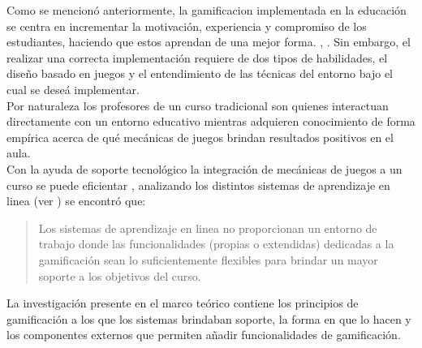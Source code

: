  Como se mencionó anteriormente, la \gls{gamificacion} implementada en la educación se centra
 en incrementar la motivación, experiencia y compromiso de los estudiantes, haciendo que estos
 aprendan de una mejor forma. \cite{GamInE-Learning}, \cite{Lee}.
 \noindent Sin embargo, el realizar una correcta implementación requiere de dos tipos de habilidades, el
 diseño basado en juegos y el entendimiento de las técnicas del entorno bajo el cual se deseá
 implementar. \cite[p. 7]{FrameWorkForTheWin}\\

 \noindent Por naturaleza los profesores de un curso tradicional son quienes interactuan
 directamente con un entorno educativo mientras adquieren conocimiento de forma empírica
 acerca de qué mecánicas de juegos brindan resultados positivos en el aula.\\

 \noindent Con la ayuda de soporte tecnológico la integración de mecánicas de juegos a un
 curso se puede eficientar \cite{Wood-Reiners}, analizando los distintos sistemas de aprendizaje en linea
 (ver ) se encontró que:

    \begin{quote}
    \colorbox{blue!05}{\parbox{\dimexpr\linewidth-2\fboxsep}{\strut%
        Los sistemas de aprendizaje en linea no proporcionan un entorno
        de trabajo donde las funcionalidades (propias o extendidas) dedicadas
        a la gamificación sean lo suficientemente flexibles para brindar un
        mayor soporte a los objetivos del curso.
    \strut}}%
    \end{quote}

 \hfill \par
 \noindent La investigación presente en el marco teórico contiene los principios de gamificación
 a los que los sistemas brindaban soporte, la forma en que lo hacen y los componentes externos que
 permiten añadir funcionalidades de gamificación.



